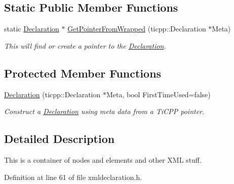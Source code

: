 \subsection*{Static Public Member Functions}
\begin{DoxyCompactItemize}
\item 
static \hyperlink{classphys_1_1xml_1_1Declaration}{Declaration} $\ast$ \hyperlink{classphys_1_1xml_1_1Declaration_ac56c088d7a58391c811a30f7a46531aa}{GetPointerFromWrapped} (ticpp::Declaration $\ast$Meta)
\begin{DoxyCompactList}\small\item\em This will find or create a pointer to the \hyperlink{classphys_1_1xml_1_1Declaration}{Declaration}. \item\end{DoxyCompactList}\end{DoxyCompactItemize}
\subsection*{Protected Member Functions}
\begin{DoxyCompactItemize}
\item 
\hyperlink{classphys_1_1xml_1_1Declaration_a0d662a464731c45c870647ff44bda8c3}{Declaration} (ticpp::Declaration $\ast$Meta, bool FirstTimeUsed=false)
\begin{DoxyCompactList}\small\item\em Construct a \hyperlink{classphys_1_1xml_1_1Declaration}{Declaration} using meta data from a TiCPP pointer. \item\end{DoxyCompactList}\end{DoxyCompactItemize}


\subsection{Detailed Description}
This is a container of nodes and elements and other XML stuff. 

Definition at line 61 of file xmldeclaration.h.



